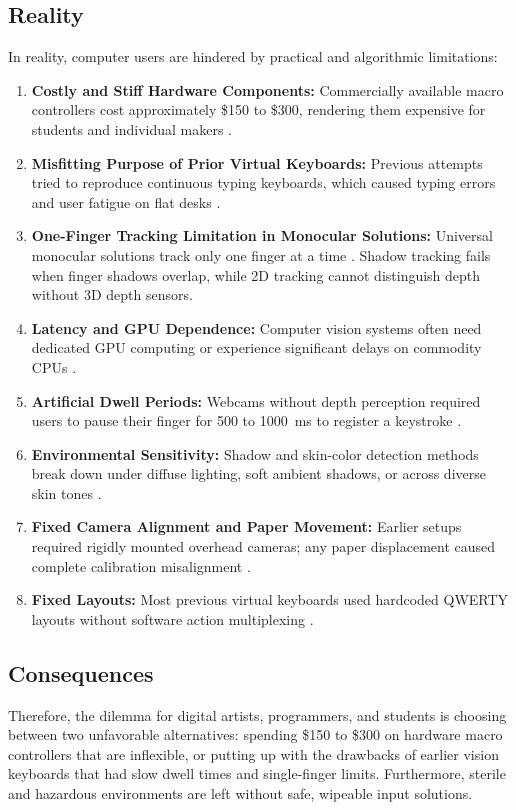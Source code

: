 \subsection{Reality}
\label{subsec:irca_reality}
In reality, computer users are hindered by practical and algorithmic limitations:
\begin{enumerate}
    \item \textbf{Costly and Stiff Hardware Components:} Commercially available macro controllers cost approximately \$150 to \$300, rendering them expensive for students and individual makers \cite{ReviewVirtualKeyboard2020}.
    \item \textbf{Misfitting Purpose of Prior Virtual Keyboards:} Previous attempts tried to reproduce continuous typing keyboards, which caused typing errors and user fatigue on flat desks \cite{ReviewVirtualKeyboard2020}.
    \item \textbf{One-Finger Tracking Limitation in Monocular Solutions:} Universal monocular solutions track only one finger at a time \cite{Thomas2013Camera, Posner2012Single, Ji2018Local, Khare2019QWERTY}. Shadow tracking fails when finger shadows overlap, while 2D tracking cannot distinguish depth without 3D depth sensors.
    \item \textbf{Latency and GPU Dependence:} Computer vision systems often need dedicated GPU computing or experience significant delays on commodity CPUs \cite{Enkhbat2020HandKey, Ji2018Local}.
    \item \textbf{Artificial Dwell Periods:} Webcams without depth perception required users to pause their finger for 500 to 1000~ms to register a keystroke \cite{Khare2019QWERTY, Chen2024Gaze}.
    \item \textbf{Environmental Sensitivity:} Shadow and skin-color detection methods break down under diffuse lighting, soft ambient shadows, or across diverse skin tones \cite{Thomas2013Camera, Yue2014Blind}.
    \item \textbf{Fixed Camera Alignment and Paper Movement:} Earlier setups required rigidly mounted overhead cameras; any paper displacement caused complete calibration misalignment \cite{Wang2016AprilTag2, Kallwies2020Determining}.
    \item \textbf{Fixed Layouts:} Most previous virtual keyboards used hardcoded QWERTY layouts without software action multiplexing \cite{ReviewVirtualKeyboard2020}.
\end{enumerate}

\subsection{Consequences}
\label{subsec:irca_consequences}
Therefore, the dilemma for digital artists, programmers, and students is choosing between two unfavorable alternatives: spending \$150 to \$300 on hardware macro controllers that are inflexible, or putting up with the drawbacks of earlier vision keyboards that had slow dwell times and single-finger limits. Furthermore, sterile and hazardous environments are left without safe, wipeable input solutions.

